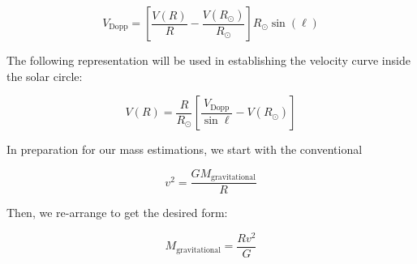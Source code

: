 \documentclass[12pt]{article}
\begin{document}
\begin{equation} \label{eq:vel_dopp}
V_\text{Dopp} = \left[ \frac{V(R)}{R} - \frac{V(R_\odot)}{R_\odot} \right] R_\odot \sin(\ell)
\end{equation}



The following representation will be used in establishing the velocity curve inside the solar circle:

\begin{equation} \label{eq:vel_curve}
V(R) = \frac{R}{R_\odot} \left[ \frac{V_\text{Dopp}}{\sin \ell} - V(R_\odot) \right] 
\end{equation}





In preparation for our mass estimations, we start with the conventional

\begin{equation}
v^2 = \frac{G M_\text{gravitational}}{R} 
\end{equation}

Then, we re-arrange to get the desired form:

\begin{equation} \label{eq:mass}
M_\text{gravitational} = \frac{R v^2}{G} 
\end{equation}
\end{document}
